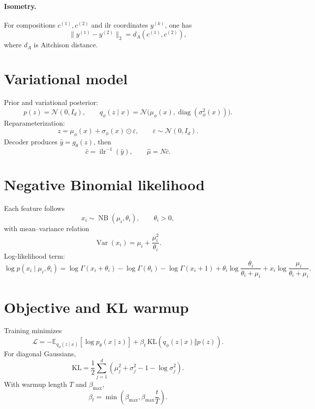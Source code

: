 \documentclass[11pt]{article}
\begin{document}
\paragraph{Isometry.}
For compositions $c^{(1)},c^{(2)}$ and ilr coordinates $y^{(k)}$, one has
\begin{equation}
\|y^{(1)}-y^{(2)}\|_2 = d_A\left(c^{(1)},c^{(2)}\right),
\end{equation}
where $d_A$ is Aitchison distance.

\section{Variational model}
Prior and variational posterior:
\begin{equation}
p(z)=\mathcal{N}(0,I_d),
\qquad
q_\phi(z\mid x)=\mathcal{N}\big(\mu_\phi(x),\operatorname{diag}(\sigma_\phi^2(x))\big).
\end{equation}
Reparameterization:
\begin{equation}
z=\mu_\phi(x)+\sigma_\phi(x)\odot \varepsilon,
\qquad \varepsilon\sim\mathcal{N}(0,I_d).
\end{equation}
Decoder produces $\hat y=g_\theta(z)$, then
\begin{equation}
\hat c=\operatorname{ilr}^{-1}(\hat y),
\qquad
\hat\mu = N\hat c.
\end{equation}

\section{Negative Binomial likelihood}
Each feature follows
\begin{equation}
x_i\sim\operatorname{NB}(\mu_i,\theta_i),\qquad \theta_i>0,
\end{equation}
with mean--variance relation
\begin{equation}
\operatorname{Var}(x_i)=\mu_i+\frac{\mu_i^2}{\theta_i}.
\end{equation}
Log-likelihood term:
\begin{equation}
\log p(x_i\mid\mu_i,\theta_i)
= \log\Gamma(x_i+\theta_i)-\log\Gamma(\theta_i)-\log\Gamma(x_i+1)
+\theta_i\log\frac{\theta_i}{\theta_i+\mu_i}
+x_i\log\frac{\mu_i}{\theta_i+\mu_i}.
\end{equation}

\section{Objective and KL warmup}
Training minimizes
\begin{equation}
\mathcal{L}
= -\mathbb{E}_{q_\phi(z\mid x)}[\log p_\theta(x\mid z)]
+\beta_t\,\mathrm{KL}\left(q_\phi(z\mid x)\Vert p(z)\right).
\end{equation}
For diagonal Gaussians,
\begin{equation}
\mathrm{KL}
=\frac12\sum_{j=1}^d\left(\mu_j^2+\sigma_j^2-1-\log\sigma_j^2\right).
\end{equation}
With warmup length $T$ and $\beta_{\max}$,
\begin{equation}
\beta_t=\min\left(\beta_{\max},\beta_{\max}\frac{t}{T}\right).
\end{equation}
\end{document}
